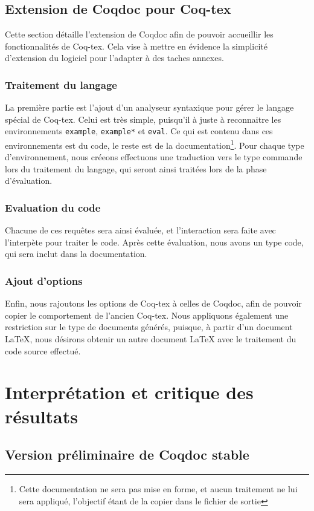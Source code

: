 \documentclass[a4paper, 11pt]{report}
\begin{document}
    \clearpage
    \subsection{Extension de Coqdoc pour Coq-tex}
    Cette section détaille l'extension de Coqdoc afin de pouvoir accueillir
    les fonctionnalités de Coq-tex. Cela vise à mettre en évidence la simplicité
    d'extension du logiciel pour l'adapter à des taches annexes.
    \subsubsection{Traitement du langage}
    La première partie est l'ajout d'un analyseur syntaxique pour gérer le
    langage spécial de Coq-tex. Celui est très simple, puisqu'il à juste
    à reconnaitre les environnements \texttt{example}, \texttt{example*} et
    \texttt{eval}. Ce qui est contenu dans ces environnements est du code, le
    reste est de la documentation\footnote{Cette documentation ne sera pas
    mise en forme, et aucun traitement ne lui sera appliqué, l'objectif étant
    de la copier dans le fichier de sortie}.
    Pour chaque type d'environnement, nous créeons effectuons une traduction
    vers le type commande lors du traitement du langage, qui seront ainsi
    traitées lors de la phase d'évaluation.

    \subsubsection{Evaluation du code}
    Chacune de ces requêtes sera ainsi évaluée, et l'interaction sera faite avec
    l'interpète pour traiter le code. Après cette évaluation, nous avons
    un type code, qui sera inclut dans la documentation.
    \subsubsection{Ajout d'options}
    Enfin, nous rajoutons les options de Coq-tex à celles de Coqdoc, afin
    de pouvoir copier le comportement de l'ancien Coq-tex. Nous appliquons
    également une restriction sur le type de documents générés, puisque, à
    partir d'un document LaTeX, nous désirons obtenir un autre document LaTeX avec
    le traitement du code source effectué.
    \clearpage
  \section{Interprétation et critique des résultats}
    \subsection{Version préliminaire de Coqdoc stable}
\end{document}
